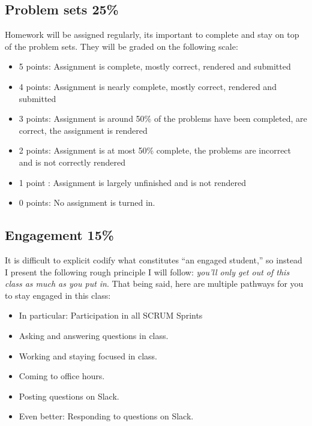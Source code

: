 \documentclass[
  letterpaper,
  DIV=11,
  numbers=noendperiod]{scrartcl}
\providecommand{\tightlist}{%
  \setlength{\itemsep}{0pt}\setlength{\parskip}{0pt}}\usepackage{longtable,booktabs,array}
\begin{document}
\hypertarget{problem-sets-25}{%
\subsection{Problem sets 25\%}\label{problem-sets-25}}

Homework will be assigned regularly, its important to complete and stay
on top of the problem sets. They will be graded on the following scale:

\begin{itemize}
\item
  5 points: Assignment is complete, mostly correct, rendered and
  submitted
\item
  4 points: Assignment is nearly complete, mostly correct, rendered and
  submitted
\item
  3 points: Assignment is around 50\% of the problems have been
  completed, are correct, the assignment is rendered
\item
  2 points: Assignment is at most 50\% complete, the problems are
  incorrect and is not correctly rendered
\item
  1 point : Assignment is largely unfinished and is not rendered
\item
  0 points: No assignment is turned in.
\end{itemize}

\hypertarget{engagement}{%
\subsection{Engagement 15\%}\label{engagement}}

It is difficult to explicit codify what constitutes ``an engaged
student,'' so instead I present the following rough principle I will
follow: \emph{you'll only get out of this class as much as you put in}.
That being said, here are multiple pathways for you to stay engaged in
this class:

\begin{itemize}
\tightlist
\item
  In particular: Participation in all SCRUM Sprints
\item
  Asking and answering questions in class.
\item
  Working and staying focused in class.
\item
  Coming to office hours.
\item
  Posting questions on Slack.
\item
  Even better: Responding to questions on Slack.
\end{itemize}
\end{document}

